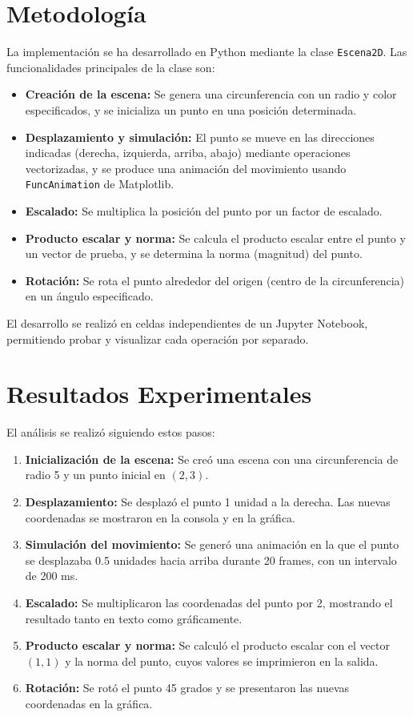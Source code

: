 \documentclass[a4paper, 10pt]{article}
\begin{document}
\section{Metodología}\label{s:2}
La implementación se ha desarrollado en Python mediante la clase \texttt{Escena2D}. Las funcionalidades principales de la clase son:
\begin{itemize}
    \item \textbf{Creación de la escena:} Se genera una circunferencia con un radio y color especificados, y se inicializa un punto en una posición determinada.
    \item \textbf{Desplazamiento y simulación:} El punto se mueve en las direcciones indicadas (derecha, izquierda, arriba, abajo) mediante operaciones vectorizadas, y se produce una animación del movimiento usando \texttt{FuncAnimation} de Matplotlib.
    \item \textbf{Escalado:} Se multiplica la posición del punto por un factor de escalado.
    \item \textbf{Producto escalar y norma:} Se calcula el producto escalar entre el punto y un vector de prueba, y se determina la norma (magnitud) del punto.
    \item \textbf{Rotación:} Se rota el punto alrededor del origen (centro de la circunferencia) en un ángulo especificado.
\end{itemize}

El desarrollo se realizó en celdas independientes de un Jupyter Notebook, permitiendo probar y visualizar cada operación por separado.

\section{Resultados Experimentales}\label{s:3}
El análisis se realizó siguiendo estos pasos:
\begin{enumerate}
    \item \textbf{Inicialización de la escena:} Se creó una escena con una circunferencia de radio 5 y un punto inicial en $(2,3)$.
    \item \textbf{Desplazamiento:} Se desplazó el punto 1 unidad a la derecha. Las nuevas coordenadas se mostraron en la consola y en la gráfica.
    \item \textbf{Simulación del movimiento:} Se generó una animación en la que el punto se desplazaba 0.5 unidades hacia arriba durante 20 frames, con un intervalo de 200 ms.
    \item \textbf{Escalado:} Se multiplicaron las coordenadas del punto por 2, mostrando el resultado tanto en texto como gráficamente.
    \item \textbf{Producto escalar y norma:} Se calculó el producto escalar con el vector $(1,1)$ y la norma del punto, cuyos valores se imprimieron en la salida.
    \item \textbf{Rotación:} Se rotó el punto 45 grados y se presentaron las nuevas coordenadas en la gráfica.
\end{enumerate}
\end{document}
